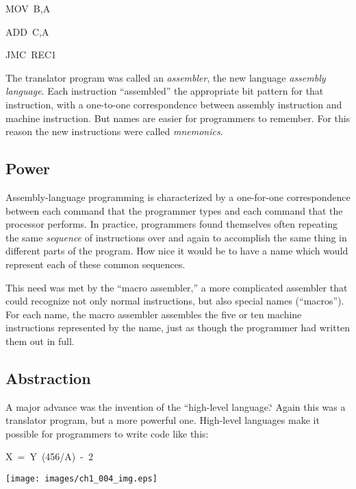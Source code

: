\begin{lyxcode}
MOV~B,A

ADD~C,A

JMC~REC1
\end{lyxcode}
The translator program was called an \emph{assembler}, the new language
\emph{assembly language}. Each instruction {}``assembled'' the appropriate
bit pattern for that instruction, with a one-to-one correspondence
between assembly instruction and machine instruction. But names are
easier for programmers to remember. For this reason the new instructions
were called \emph{mnemonics}.


\subsection*{Power}

Assembly-language programming is characterized by a one-for-one correspondence
between each command that the programmer types and each command that
the processor performs. In practice, programmers found themselves
often repeating the same \emph{sequence} of instructions over and
again to accomplish the same thing in different parts of the program.
How nice it would be to have a name which would represent each of
these common sequences.

This need was met by the {}``macro assembler,'' a more complicated
assembler that could recognize not only normal instructions, but also
special names ({}``macros''). For each name, the macro assembler
assembles the five or ten machine instructions represented by the
name, just as though the programmer had written them out in full.


\subsection*{Abstraction}

A major advance was the invention of the {}``high-level language.\char`\"{}
Again this was a translator program, but a more powerful one. High-level
languages make it possible for programmers to write code like this:

\begin{lyxcode}
X~=~Y~(456/A)~-~2
\end{lyxcode}
\texttt{[image: images/ch1\_004\_img.eps]}

